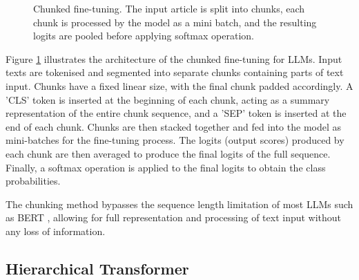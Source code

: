 \begin{figure}[htbp]
    \caption{Chunked fine-tuning. The input article is split into chunks, each chunk is processed by the model as a mini batch, and the resulting logits are pooled before applying softmax operation.}
    \label{fig:chunk_bert_finetuning}
\end{figure}

Figure \ref{fig:chunk_bert_finetuning} illustrates the architecture of the chunked fine-tuning for LLMs. Input texts are tokenised and segmented into separate chunks containing parts of text input. Chunks have a fixed linear size, with the final chunk padded accordingly. A 'CLS' token is inserted at the beginning of each chunk, acting as a summary representation of the entire chunk sequence, and a 'SEP' token is inserted at the end of each chunk. Chunks are then stacked together and fed into the model as mini-batches for the fine-tuning process. The logits (output scores) produced by each chunk are then averaged to produce the final logits of the full sequence. Finally, a softmax operation is applied to the final logits to obtain the class probabilities.

The chunking method bypasses the sequence length limitation of most LLMs such as BERT \cite{devlin-2019-bert}, allowing for full representation and processing of text input without any loss of information.


\subsection{Hierarchical Transformer}

